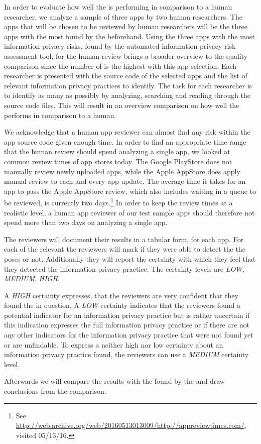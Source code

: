 In order to evaluate how well the \aiprat is performing in comparison to a human researcher, we analyze a sample of three apps by two human researchers.
The apps that will be chosen to be reviewed by human researchers will be the three apps with the most \ipr found by the \aiprat beforehand.
Using the three apps with the most information privacy risks, found by the automated information privacy risk assessment tool, for the human review brings a broader overview to the quality comparison since the number of \ipr is the highest with this app selection.
Each researcher is presented with the source code of the selected apps and the list of relevant information privacy practices to identify.
The task for each researcher is to identify as many \ipp as possibly by analyzing, searching and reading through the source code files. 
This will result in an overview comparison on how well the \aiprat performs in comparison to a human.

We acknowledge that a human app reviewer can almost find any \ipp risk within the app source code given enough time.
In order to find an appropriate time range that the human review should spend analyzing a single app, we looked at common review times of app stores today.
The Google PlayStore does not manually review newly uploaded apps, while the Apple AppStore does apply manual review to each and every app update.
The average time it takes for an app to pass the Apple AppStore review, which also includes waiting in a queue to be reviewed, is currently two days.\footnote{See \url{http://web.archive.org/web/20160513013009/http://appreviewtimes.com/}, visited 05/13/16.}
In order to keep the review times at a realistic level, a human app reviewer of our test sample apps should therefore not spend more than two days on analyzing a single app.

The reviewers will document their results in a tabular form, for each app.
For each of the relevant \ipp the reviewers will mark if they were able to detect the \ipr the \ipp poses or not.
Additionally they will report the certainty with which they feel that they detected the information privacy practice.
The certainty levels are \textit{LOW}, \textit{MEDIUM}, \textit{HIGH}.

A \textit{HIGH} certainty expresses, that the reviewers are very confident that they found the \ipp in question.
A \textit{LOW} certainty indicates that the reviewers found a potential indicator for an information privacy practice but is rather uncertain if this indication expresses the full information privacy practice or if there are not any other indicators for the information privacy practice that were not found yet or are unfindable.
To express a neither high nor low certainty about an information privacy practice found, the reviewers can use a \textit{MEDIUM} certainty level.

Afterwards we will compare the results with the \ipr found by the \aiprat and draw conclusions from the comparison.